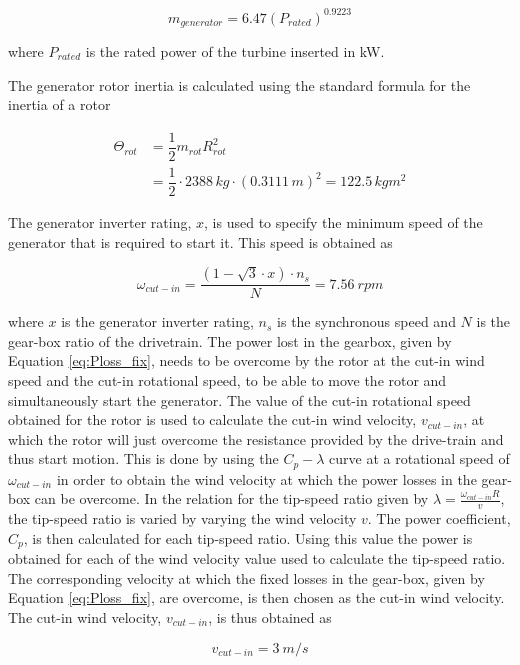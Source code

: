\begin{equation}
    m_{generator} = 6.47 \left(P_{rated}\right)^{0.9223}
\end{equation}

where $P_{rated}$ is the rated power of the turbine inserted in kW. 

The generator rotor inertia is calculated using the standard formula for the inertia of a rotor

\begin{align}
\Theta_{rot} &= \dfrac{1}{2}m_{rot}R_{rot}^2 \\
&= \dfrac{1}{2}\cdot 2388\,kg \cdot (0.3111 \,m)^2 = 122.5 \, kgm^2 \nonumber
\end{align}

The generator inverter rating, $x$, is used to specify the minimum speed of the generator that is required to start it. This speed is obtained as

\begin{equation}
    \omega_{cut-in} = \dfrac{(1- \sqrt{3}\cdot x)\cdot n_s}{N}= 7.56\ rpm
\label{eq:cut-in_speed}
\end{equation}

where $x$ is the generator inverter rating, $n_s$ is the synchronous speed and $N$ is the gear-box ratio of the drivetrain. 
The power lost in the gearbox, given by Equation \ref{eq:Ploss_fix}, needs to be overcome by the rotor at the cut-in wind speed and the cut-in rotational speed, to be able to move the rotor and simultaneously start the generator. The value of the cut-in rotational speed obtained for the rotor is used to calculate the cut-in wind velocity, $v_{cut-in}$, at which the rotor will just overcome the resistance provided by the drive-train and thus start motion. This is done by using the $C_p-\lambda$ curve at a rotational speed of $\omega_{cut-in}$ in order to obtain the wind velocity at which the power losses in the gear-box can be overcome.
In the relation for the tip-speed ratio given by $\lambda= \frac{\omega_{cut-in} R}{v}$, the tip-speed ratio is varied by varying the wind velocity $v$. The power coefficient, $C_p$, is then calculated for each tip-speed ratio. Using this value the power is obtained for each of the wind velocity value used to calculate the tip-speed ratio. The corresponding velocity at which the fixed losses in the gear-box, given by Equation \ref{eq:Ploss_fix}, are overcome, is then chosen as the cut-in wind velocity.
The cut-in wind velocity, $v_{cut-in}$, is thus obtained as

\begin{equation}
    v_{cut-in} = 3\ m/s
\label{eq:cut-in_wind_vel}
\end{equation}

